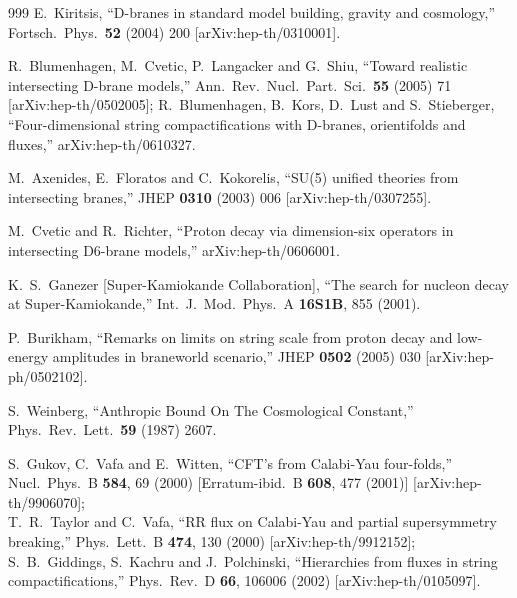 \begin{thebibliography}{999}
  E.~Kiritsis,
  ``D-branes in standard model building, gravity and cosmology,''
  Fortsch.\ Phys.\  {\bf 52} (2004) 200
  [arXiv:hep-th/0310001].

  R.~Blumenhagen, M.~Cvetic, P.~Langacker and G.~Shiu,
  ``Toward realistic intersecting D-brane models,''
  Ann.\ Rev.\ Nucl.\ Part.\ Sci.\  {\bf 55} (2005) 71
  [arXiv:hep-th/0502005];
  R.~Blumenhagen, B.~Kors, D.~Lust and S.~Stieberger,
  ``Four-dimensional string compactifications with D-branes, orientifolds and
  fluxes,''
  arXiv:hep-th/0610327.


  M.~Axenides, E.~Floratos and C.~Kokorelis,
  ``SU(5) unified theories from intersecting branes,''
  JHEP {\bf 0310} (2003) 006
  [arXiv:hep-th/0307255].



  M.~Cvetic and R.~Richter,
  ``Proton decay via dimension-six operators in intersecting D6-brane models,''
  arXiv:hep-th/0606001.


  K.~S.~Ganezer  [Super-Kamiokande Collaboration],
  ``The search for nucleon decay at Super-Kamiokande,''
  Int.\ J.\ Mod.\ Phys.\ A {\bf 16S1B}, 855 (2001).

  P.~Burikham,
  ``Remarks on limits on string scale from proton decay and low-energy
  amplitudes in braneworld scenario,''
  JHEP {\bf 0502} (2005) 030
  [arXiv:hep-ph/0502102].

  S.~Weinberg,
  ``Anthropic Bound On The Cosmological Constant,''
  Phys.\ Rev.\ Lett.\  {\bf 59} (1987) 2607.

  S.~Gukov, C.~Vafa and E.~Witten,
  ``CFT's from Calabi-Yau four-folds,''
  Nucl.\ Phys.\ B {\bf 584}, 69 (2000)
  [Erratum-ibid.\ B {\bf 608}, 477 (2001)]
  [arXiv:hep-th/9906070];
\\
 T.~R.~Taylor and C.~Vafa,
  ``RR flux on Calabi-Yau and partial supersymmetry breaking,''
  Phys.\ Lett.\ B {\bf 474}, 130 (2000)
  [arXiv:hep-th/9912152];
\\
  S.~B.~Giddings, S.~Kachru and J.~Polchinski,
  ``Hierarchies from fluxes in string compactifications,''
  Phys.\ Rev.\ D {\bf 66}, 106006 (2002)
  [arXiv:hep-th/0105097].


\end{thebibliography}
